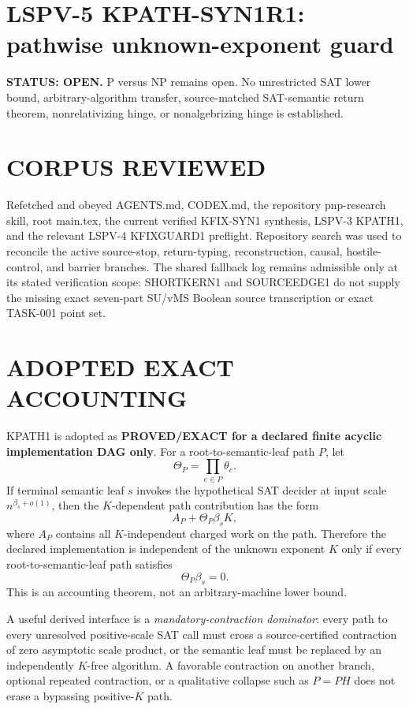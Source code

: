 \documentclass[11pt]{article}
\begin{document}
\section*{LSPV-5 KPATH-SYN1R1: pathwise unknown-exponent guard}

\textbf{STATUS: OPEN.} P versus NP remains open. No unrestricted SAT lower bound, arbitrary-algorithm transfer, source-matched SAT-semantic return theorem, nonrelativizing hinge, or nonalgebrizing hinge is established.

\section*{CORPUS REVIEWED}
Refetched and obeyed AGENTS.md, CODEX.md, the repository pnp-research skill, root main.tex, the current verified KFIX-SYN1 synthesis, LSPV-3 KPATH1, and the relevant LSPV-4 KFIXGUARD1 preflight. Repository search was used to reconcile the active source-stop, return-typing, reconstruction, causal, hostile-control, and barrier branches. The shared fallback log remains admissible only at its stated verification scope: SHORTKERN1 and SOURCEEDGE1 do not supply the missing exact seven-part SU/vMS Boolean source transcription or exact TASK-001 point set.

\section*{ADOPTED EXACT ACCOUNTING}
KPATH1 is adopted as \textbf{PROVED/EXACT for a declared finite acyclic implementation DAG only}. For a root-to-semantic-leaf path \(P\), let
\[
\Theta_P=\prod_{e\in P}\theta_e.
\]
If terminal semantic leaf \(s\) invokes the hypothetical SAT decider at input scale \(n^{\beta_s+o(1)}\), then the \(K\)-dependent path contribution has the form
\[
A_P+\Theta_P\beta_s K,
\]
where \(A_P\) contains all \(K\)-independent charged work on the path. Therefore the declared implementation is independent of the unknown exponent \(K\) only if every root-to-semantic-leaf path satisfies
\[
\Theta_P\beta_s=0.
\]
This is an accounting theorem, not an arbitrary-machine lower bound.

A useful derived interface is a \emph{mandatory-contraction dominator}: every path to every unresolved positive-scale SAT call must cross a source-certified contraction of zero asymptotic scale product, or the semantic leaf must be replaced by an independently \(K\)-free algorithm. A favorable contraction on another branch, optional repeated contraction, or a qualitative collapse such as \(P=PH\) does not erase a bypassing positive-\(K\) path.
\end{document}
